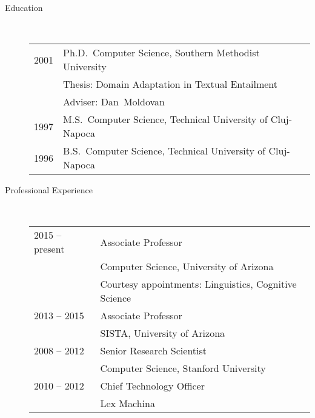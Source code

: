 \documentclass[10pt]{article}
\begin{document}
\begin{description}

\item [Education]\

\begin{tabular}{lp{4.5in}}
\hspace{-.2cm}2001 &  Ph.D.~Computer Science, {\sc Southern Methodist University}
\\\vspace{.0cm}&Thesis: Domain Adaptation in Textual Entailment
\\\vspace{.1cm}& Adviser: Dan~Moldovan\\
\vspace{.1cm}\hspace{-.2cm}1997 &  M.S.~Computer Science, {\sc Technical University of Cluj-Napoca} \\
\hspace{-.2cm}1996 & B.S.~Computer Science,  {\sc Technical University of Cluj-Napoca}
\end{tabular}


\item [Professional Experience]\

\begin{tabular}{lp{4.9in}}
\hspace{-.2cm}2015 -- present & Associate Professor\\\vspace{.1cm}
& Computer Science, {\sc University of Arizona}\\\vspace{.1cm}
& Courtesy appointments: Linguistics, Cognitive Science\\

\hspace{-.2cm}2013 -- 2015 & Associate Professor\\\vspace{.1cm}
& SISTA, {\sc University of Arizona} \\

\hspace{-.2cm}2008 -- 2012 & Senior Research Scientist\\\vspace{.1cm}
& Computer Science, {\sc Stanford University} \\

\hspace{-.2cm}2010 -- 2012 & Chief Technology Officer\\\vspace{.1cm}
& {\sc Lex Machina} \\


\end{tabular}
\end{description}
\end{document}
